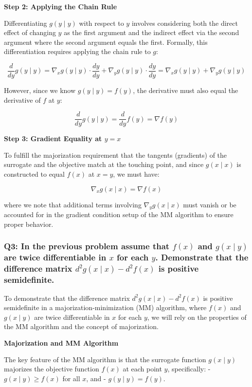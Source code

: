 \documentclass[8pt]{article}
\begin{document}
\textbf{Step 2: Applying the Chain Rule}

Differentiating \(g(y \mid y)\) with respect to \(y\) involves considering both the direct effect of changing \(y\) as the first argument and the indirect effect via the second argument where the second argument equals the first. Formally, this differentiation requires applying the chain rule to \(g\):

\[
\frac{d}{dy} g(y \mid y) = \nabla_x g(y \mid y) \cdot \frac{dy}{dy} + \nabla_y g(y \mid y) \cdot \frac{dy}{dy} = \nabla_x g(y \mid y) + \nabla_y g(y \mid y)
\]

However, since we know \(g(y \mid y) = f(y)\), the derivative must also equal the derivative of \(f\) at \(y\):

\[
\frac{d}{dy} g(y \mid y) = \frac{d}{dy} f(y) = \nabla f(y)
\]

\textbf{Step 3: Gradient Equality at \(y = x\)}

To fulfill the majorization requirement that the tangents (gradients) of the surrogate and the objective match at the touching point, and since \(g(x \mid x)\) is constructed to equal \(f(x)\) at \(x = y\), we must have:

\[
\nabla_x g(x \mid x) = \nabla f(x)
\]

where we note that additional terms involving \(\nabla_y g(x \mid x)\) must vanish or be accounted for in the gradient condition setup of the MM algorithm to ensure proper behavior.

\subsubsection*{Q3: In the previous problem assume that \(f(x)\) and \(g(x \mid y)\) are twice differentiable in \(x\) for each \(y\). Demonstrate that the difference matrix \(d^2 g(x \mid x) - d^2 f(x)\) is positive semidefinite.}

To demonstrate that the difference matrix \(d^2 g(x \mid x) - d^2 f(x)\) is positive semidefinite in a majorization-minimization (MM) algorithm, where \(f(x)\) and \(g(x \mid y)\) are twice differentiable in \(x\) for each \(y\), we will rely on the properties of the MM algorithm and the concept of majorization.

\textbf{ Majorization and MM Algorithm}

The key feature of the MM algorithm is that the surrogate function \(g(x \mid y)\) majorizes the objective function \(f(x)\) at each point \(y\), specifically:
- \(g(x \mid y) \geq f(x)\) for all \(x\), and
- \(g(y \mid y) = f(y)\).
\end{document}
